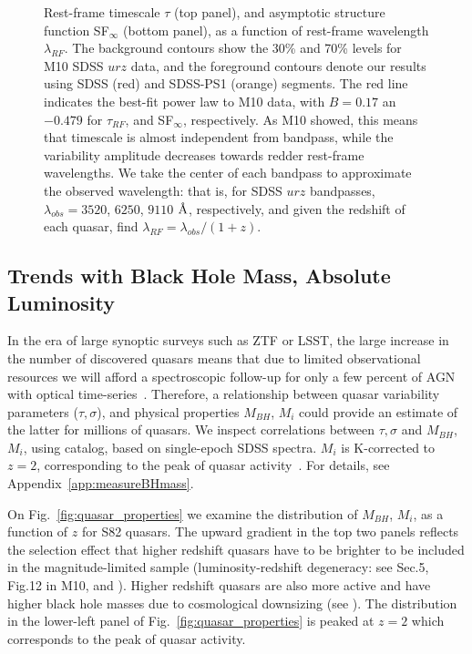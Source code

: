 \documentclass[twocolumn]{aastex62}
\let\oldAA\AA
\renewcommand{\AA}{\text{\normalfont\oldAA}}
\begin{document}
  
\begin{figure}
	\caption{Rest-frame timescale $\tau$ (top panel), and asymptotic structure function SF$_{\infty}$ (bottom panel), as a function of rest-frame wavelength $\lambda_{RF}$. The background contours show the 30\% and 70\% levels for  M10 SDSS $ urz $  data, and the foreground contours  denote our results using  SDSS (red) and SDSS-PS1 (orange) segments. The red line indicates the best-fit power law to M10 data, with $B=0.17$ an $-0.479$ for $\tau_{RF}$, and SF$_{\infty}$, respectively. As M10 showed, this means that timescale is almost independent from bandpass, while the variability amplitude decreases towards  redder rest-frame wavelengths.  We take the center of each bandpass to approximate the  observed wavelength: that is, for SDSS $urz$ bandpasses,  $\lambda_{obs} = 3520$, $6250$, $9110$ $\mbox{\AA}$, respectively, and given the redshift of each quasar, find $\lambda_{RF}=\lambda_{obs} / (1+z)$.}
	\label{fig:lambda_dependence}
\end{figure} 




\subsection{Trends with Black Hole Mass, Absolute Luminosity}

In the era of large synoptic surveys such as ZTF or LSST, the large increase in the number of discovered quasars means that due to limited observational resources we will afford a spectroscopic follow-up for only a few percent of AGN with optical time-series~\citep{ivezic2019}. Therefore, a relationship between quasar variability parameters ($\tau, \sigma$), and physical properties $M_{BH}$, $M_{i}$ could provide an estimate of the latter for millions of quasars. We inspect correlations between $\tau, \sigma$  and $M_{BH}$, $M_{i}$, using \cite{shen2011} catalog, based on single-epoch SDSS spectra. $M_{i}$ is K-corrected to  $z= 2$, corresponding to the peak of quasar activity~\citep{richards2006a}. For details, see Appendix~\ref{app:measureBHmass}.

On Fig.~\ref{fig:quasar_properties} we examine the distribution of $M_{BH}$, $M_{i}$, as a function of $z$ for S82 quasars. The upward gradient in the top two panels reflects the selection effect that higher redshift quasars have to be brighter to be included in the magnitude-limited sample (luminosity-redshift degeneracy: see Sec.5, Fig.12 in M10, and \citealt{dong2018}). Higher redshift quasars are also more active  and have higher black hole masses due to cosmological downsizing (see \citealt{babic2007,labita2009, mclure2004}). The distribution in the lower-left panel of Fig.~\ref{fig:quasar_properties} is peaked at $z=2$ which corresponds to the peak of quasar activity. 
\end{document}
